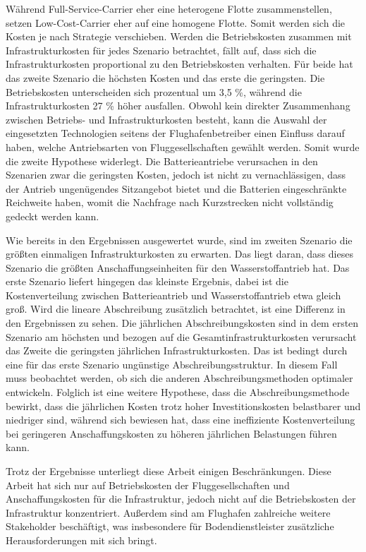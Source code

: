 Während Full-Service-Carrier eher eine heterogene Flotte zusammenstellen, 
setzen Low-Cost-Carrier eher auf eine homogene Flotte.
Somit werden sich die Kosten je nach Strategie verschieben.
Werden die Betriebskosten zusammen mit Infrastrukturkosten für jedes Szenario betrachtet, fällt auf, 
dass sich die Infrastrukturkosten proportional zu den Betriebskosten verhalten. 
Für beide hat das zweite Szenario die höchsten Kosten und das erste die geringsten. 
Die Betriebskosten unterscheiden sich prozentual um 3,5 \%, 
während die Infrastrukturkosten 27 \% höher ausfallen.
Obwohl kein direkter Zusammenhang zwischen Betriebs- und Infrastrukturkosten besteht, 
kann die Auswahl der eingesetzten Technologien seitens der Flughafenbetreiber einen Einfluss darauf haben, 
welche Antriebsarten von Fluggesellschaften gewählt werden. Somit wurde die zweite Hypothese widerlegt.
Die Batterieantriebe verursachen in den Szenarien zwar die geringsten Kosten,
jedoch ist nicht zu vernachlässigen, dass der Antrieb ungenügendes Sitzangebot bietet
und die Batterien eingeschränkte Reichweite haben, 
womit die Nachfrage nach Kurzstrecken nicht vollständig gedeckt werden kann.


Wie bereits in den Ergebnissen ausgewertet wurde, sind im zweiten Szenario die größten einmaligen Infrastrukturkosten zu erwarten.
Das liegt daran, dass dieses Szenario die größten Anschaffungseinheiten für den Wasserstoffantrieb hat. 
Das erste Szenario liefert hingegen das kleinste Ergebnis, dabei ist die Kostenverteilung zwischen Batterieantrieb 
und Wasserstoffantrieb etwa gleich groß.
Wird die lineare Abschreibung zusätzlich betrachtet, ist eine Differenz in den Ergebnissen zu sehen. 
Die jährlichen Abschreibungskosten sind in dem ersten Szenario am höchsten 
und bezogen auf die Gesamtinfrastrukturkosten verursacht das Zweite 
die geringsten jährlichen Infrastrukturkosten.
Das ist bedingt durch eine für das erste Szenario ungünstige Abschreibungsstruktur. 
In diesem Fall muss beobachtet werden, ob sich die anderen Abschreibungsmethoden optimaler entwickeln.
Folglich ist eine weitere Hypothese, dass die Abschreibungsmethode bewirkt, 
dass die jährlichen Kosten trotz hoher Investitionskosten belastbarer und niedriger sind, 
während sich bewiesen hat, dass eine ineffiziente Kostenverteilung bei geringeren Anschaffungskosten zu 
höheren jährlichen Belastungen führen kann.

%
Trotz der Ergebnisse unterliegt diese Arbeit einigen Beschränkungen. %
Diese Arbeit hat sich nur auf Betriebskosten der Fluggesellschaften und Anschaffungskosten für die Infrastruktur,
jedoch nicht auf die Betriebskosten der Infrastruktur konzentriert. 
Außerdem sind am Flughafen zahlreiche weitere Stakeholder beschäftigt, 
was insbesondere für Bodendienstleister zusätzliche Herausforderungen mit sich bringt.

